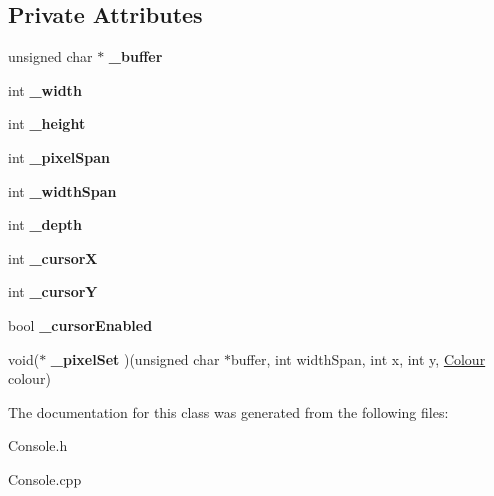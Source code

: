 \subsection*{Private Attributes}
\begin{DoxyCompactItemize}
\item 
\mbox{\label{class_graphical_console_driver_a1ac384f819df9631698169a6e415619d}} 
unsigned char $\ast$ {\bfseries \+\_\+buffer}
\item 
\mbox{\label{class_graphical_console_driver_a86c44fe737f2b02079b265bc79e8f4d5}} 
int {\bfseries \+\_\+width}
\item 
\mbox{\label{class_graphical_console_driver_a096769686cfbc0105b974764ce26914c}} 
int {\bfseries \+\_\+height}
\item 
\mbox{\label{class_graphical_console_driver_aefa1fcb29ead61934b858120a842709b}} 
int {\bfseries \+\_\+pixel\+Span}
\item 
\mbox{\label{class_graphical_console_driver_ab95a4db949ab1cf30e7791f3a53ef84a}} 
int {\bfseries \+\_\+width\+Span}
\item 
\mbox{\label{class_graphical_console_driver_a130f94eb15b6984575dcf232286a8701}} 
int {\bfseries \+\_\+depth}
\item 
\mbox{\label{class_graphical_console_driver_a5f29285731b4d8b2a185834e6264d775}} 
int {\bfseries \+\_\+cursorX}
\item 
\mbox{\label{class_graphical_console_driver_ad470a64bee743d331c954d08da26639d}} 
int {\bfseries \+\_\+cursorY}
\item 
\mbox{\label{class_graphical_console_driver_abd445916d14b4a5d430058ab496986ec}} 
bool {\bfseries \+\_\+cursor\+Enabled}
\item 
\mbox{\label{class_graphical_console_driver_aab1afdf45a335c4ea3965a29ec8a101e}} 
void($\ast$ {\bfseries \+\_\+pixel\+Set} )(unsigned char $\ast$buffer, int width\+Span, int x, int y, \hyperlink{class_console_driver_1_1_colour}{Colour} colour)
\end{DoxyCompactItemize}


The documentation for this class was generated from the following files\+:\begin{DoxyCompactItemize}
\item 
Console.\+h\item 
Console.\+cpp\end{DoxyCompactItemize}
